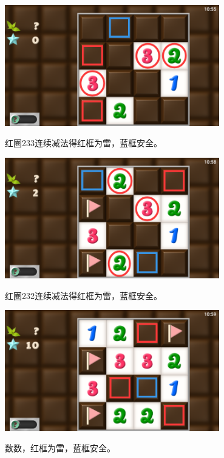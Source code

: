 \subsection{} %
\begin{center}
    \includegraphics[width=0.7\textwidth]{puzzle/124-1.png}
\end{center}
红圈233连续减法得红框为雷，蓝框安全。
\begin{center}
    \includegraphics[width=0.7\textwidth]{puzzle/124-2.png}
\end{center}
红圈232连续减法得红框为雷，蓝框安全。
\begin{center}
    \includegraphics[width=0.7\textwidth]{puzzle/124-3.png}
\end{center}
数数，红框为雷，蓝框安全。

